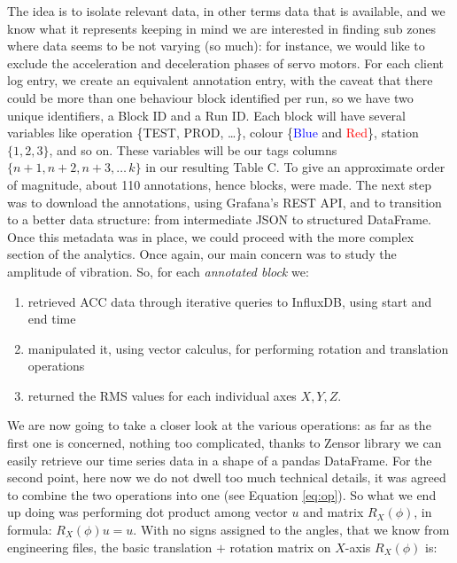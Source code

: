 The idea is to isolate relevant data, in other terms data that is available, and we know what it represents keeping in mind we are interested in finding sub zones 
where data seems to be not varying (so much): for instance, we would like to exclude the acceleration and deceleration phases of servo motors.
For each client log entry, we create an equivalent annotation entry, with the caveat that there could be more than one behaviour block identified per run, so we have two unique identifiers, a Block ID and a Run ID. 
Each block will have several variables like operation \{TEST, PROD, \dots\}, colour \{\textcolor{blue}{Blue} and \textcolor{red}{Red}\}, station $\{1,2,3\}$, and so on. 
These variables will be our tags columns $\{n+1, n+2, n+3, \dots\, k\}$ in our resulting Table C. To give an approximate order of magnitude, about 110 annotations, hence blocks, were made.
The next step was to download the annotations, using Grafana's REST API, and to transition to a better data structure: from intermediate JSON to structured DataFrame.
Once this metadata was in place, we could proceed with the more complex section of the analytics.
Once again, our main concern was to study the amplitude of vibration. So, for each \emph{annotated block} we: 
\begin{enumerate}
    \item retrieved ACC data through iterative queries to InfluxDB, using start and end time
    \item manipulated it, using vector calculus, for performing rotation and translation operations
    \item returned the \ac{RMS} values for each individual axes $X,Y,Z$.
\end{enumerate}
We are now going to take a closer look at the various operations: %
as far as the first one is concerned, nothing too complicated, thanks to Zensor library we can easily retrieve our time series data in a shape of a pandas DataFrame.
For the second point, here now we do not dwell too much technical details, it was agreed to combine the two operations into one (see Equation \ref{eq:op}).
So what we end up doing was performing dot product among vector $u$ and matrix $R_X(\phi)$, in formula: $R_X(\phi)u = u$.
With no signs assigned to the angles, that we know from engineering files, the basic translation $+$ rotation matrix on $X$-axis $R_X(\phi)$ is:
